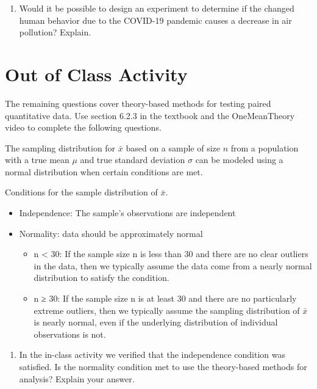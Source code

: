\documentclass[
]{report}
\providecommand{\tightlist}{%
  \setlength{\itemsep}{0pt}\setlength{\parskip}{0pt}}
\begin{document}
\begin{enumerate}
\def\labelenumi{\arabic{enumi}.}
\setcounter{enumi}{23}
\tightlist
\item
  Would it be possible to design an experiment to determine if the changed human behavior due to the COVID-19 pandemic causes a decrease in air pollution? Explain.
  \vspace{0.6in}
\end{enumerate}

\newpage

\hypertarget{out-of-class-activity}{%
\section{Out of Class Activity}\label{out-of-class-activity}}

The remaining questions cover theory-based methods for testing paired quantitative data. Use section 6.2.3 in the textbook and the OneMeanTheory video to complete the following questions.

The sampling distribution for \(\bar{x}\) based on a sample of size \(n\) from a population with a true mean \(\mu\) and true standard deviation \(\sigma\) can be modeled using a normal distribution when certain conditions are met.

Conditions for the sample distribution of \(\bar{x}\).

\begin{itemize}
\item
  Independence: The sample's observations are independent
\item
  Normality: data should be approximately normal

  \begin{itemize}
  \item
    n \textless{} 30: If the sample size n is less than 30 and there are no clear outliers in the data, then we typically assume the data come from a nearly normal distribution to satisfy the condition.
  \item
    n ≥ 30: If the sample size n is at least 30 and there are no particularly extreme outliers, then we typically assume the sampling distribution of \(\bar{x}\) is nearly normal, even if the underlying distribution of individual observations is not.
  \end{itemize}
\end{itemize}

\begin{enumerate}
\def\labelenumi{\arabic{enumi}.}
\tightlist
\item
  In the in-class activity we verified that the independence condition was satisfied. Is the normality condition met to use the theory-based methods for analysis? Explain your answer.
\end{enumerate}
\end{document}
